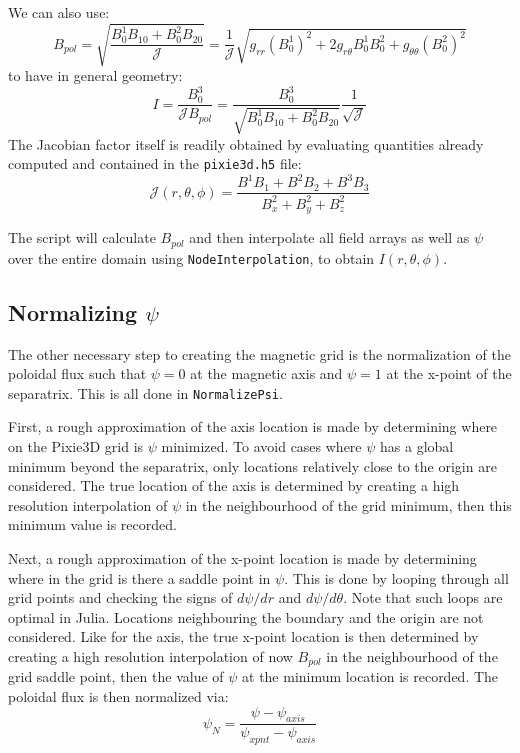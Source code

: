 \documentclass[12pt]{article}
\begin{document}
We can also use:
\begin{equation}
    B_{pol} = \sqrt{\frac{B^1_0 B_{10} + B^2_0 B_{20}}{\mathcal{J}}} = \frac{1}{\mathcal{J}} \sqrt{g_{rr}(B^1_0)^2 + 2 g_{r\theta} B^1_0 B^2_0 + g_{\theta\theta} (B^2_0)^2}
\end{equation}
to have in general geometry:
\begin{equation}
    I = \frac{B^3_0}{\mathcal{J} B_{pol}} = \frac{B^3_0}{\sqrt{B^1_0 B_{10} + B^2_0 B_{20}}} \frac{1}{\sqrt{\mathcal{J}}}
\end{equation}
The Jacobian factor itself is readily obtained by evaluating quantities already computed and contained in the \texttt{pixie3d.h5} file:
\begin{equation}
    \mathcal{J}(r,\theta,\phi) = \frac{B^1 B_1 + B^2 B_2 + B^3 B_3 }{B^2_x + B^2_y + B^2_z}
\end{equation}

The script will calculate $B_{pol}$ and then interpolate all field arrays as well as $\psi$ over the entire domain using \texttt{NodeInterpolation}, to obtain $I(r,\theta,\phi)$.

\subsection{Normalizing $\psi$}
The other necessary step to creating the magnetic grid is the normalization of the poloidal flux such that $\psi = 0$ at the magnetic axis and $\psi = 1$ at the x-point of the separatrix.
This is all done in \texttt{NormalizePsi}.

First, a rough approximation of the axis location is made by determining where on the Pixie3D grid is $\psi$ minimized.
To avoid cases where $\psi$ has a global minimum beyond the separatrix, only locations relatively close to the origin are considered.
The true location of the axis is determined by creating a high resolution interpolation of $\psi$ in the neighbourhood of the grid minimum, then this minimum value is recorded.

Next, a rough approximation of the x-point location is made by determining where in the grid is there a saddle point in $\psi$.
This is done by looping through all grid points and checking the signs of $d\psi/dr$ and $d\psi/d\theta$.
Note that such loops are optimal in Julia.
Locations neighbouring the boundary and the origin are not considered.
Like for the axis, the true x-point location is then determined by creating a high resolution interpolation of now $B_{pol}$ in the neighbourhood of the grid saddle point, then the value of $\psi$ at the minimum location is recorded.
The poloidal flux is then normalized via:
\begin{equation}
    \psi_N = \frac{\psi - \psi_{axis}}{\psi_{xpnt} - \psi_{axis}}
\end{equation}
\end{document}

